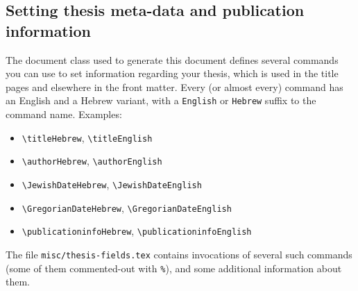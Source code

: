 \subsection*{Setting thesis meta-data and publication information}

The document class used to generate this document defines several commands you can use to set information  regarding your thesis, which is used in the title pages and elsewhere in the front matter.  Every (or almost every) command has an English and a Hebrew variant, with a \texttt{English} or \texttt{Hebrew} suffix to the command name. Examples:
\begin{itemize}
\item \verb|\titleHebrew|, \verb|\titleEnglish|
\item \verb|\authorHebrew|, \verb|\authorEnglish|
\item \verb|\JewishDateHebrew|, \verb|\JewishDateEnglish|
\item \verb|\GregorianDateHebrew|, \verb|\GregorianDateEnglish|
\item \verb|\publicationinfoHebrew|, \verb|\publicationinfoEnglish|
\end{itemize}

The file \texttt{misc/thesis-fields.tex} contains invocations of several such commands (some of them commented-out with \texttt{\%}), and some additional information about them.

